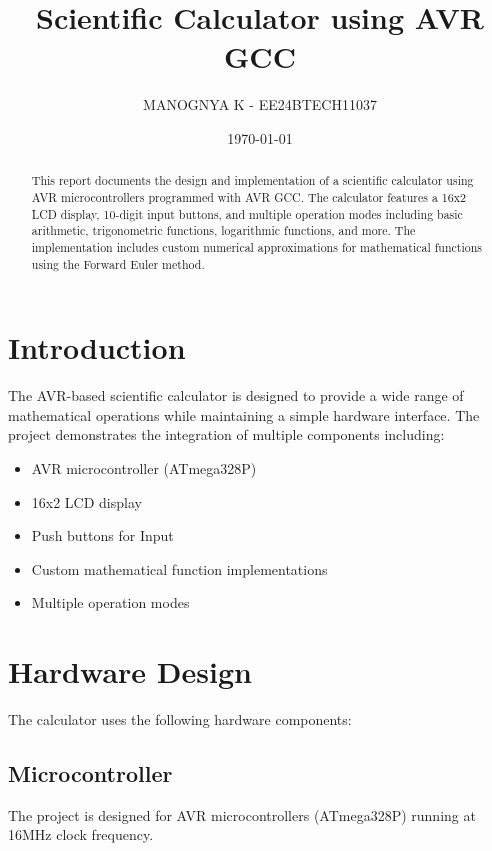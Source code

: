 \documentclass{article}
\title{Scientific Calculator using AVR GCC}
\author{MANOGNYA K - EE24BTECH11037}
\date{\today}
\begin{document}
\maketitle

\begin{abstract}
This report documents the design and implementation of a scientific calculator using AVR microcontrollers programmed with AVR GCC. The calculator features a 16x2 LCD display, 10-digit input buttons, and multiple operation modes including basic arithmetic, trigonometric functions, logarithmic functions, and more. The implementation includes custom numerical approximations for mathematical functions using the Forward Euler method.
\end{abstract}

\tableofcontents

\section{Introduction}
The AVR-based scientific calculator is designed to provide a wide range of mathematical operations while maintaining a simple hardware interface. The project demonstrates the integration of multiple components including:

\begin{itemize}
    \item AVR microcontroller (ATmega328P)
    \item 16x2 LCD display
    \item Push buttons for Input 
    \item Custom mathematical function implementations
    \item Multiple operation modes
\end{itemize}

\section{Hardware Design}
The calculator uses the following hardware components:

\subsection{Microcontroller}
The project is designed for AVR microcontrollers (ATmega328P) running at 16MHz clock frequency.
\end{document}
